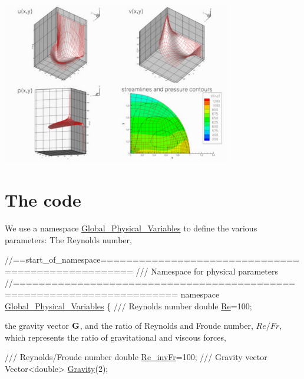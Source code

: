  
\begin{DoxyImage}
\includegraphics[width=0.75\textwidth]{sol2}
\end{DoxyImage}




 

\hypertarget{index_code}{}\section{The code}\label{index_code}
We use a namespace {\ttfamily \hyperlink{namespaceGlobal__Physical__Variables}{Global\+\_\+\+Physical\+\_\+\+Variables}} to define the various parameters\+: The Reynolds number,

 
\begin{DoxyCodeInclude}
\textcolor{comment}{//==start\_of\_namespace===================================================}
\textcolor{comment}{/// Namespace for physical parameters}
\textcolor{comment}{}\textcolor{comment}{//=======================================================================}
\textcolor{keyword}{namespace }\hyperlink{namespaceGlobal__Physical__Variables}{Global\_Physical\_Variables}
\{\textcolor{comment}{}
\textcolor{comment}{ /// Reynolds number}
\textcolor{comment}{} \textcolor{keywordtype}{double} \hyperlink{namespaceGlobal__Physical__Variables_ab814e627d2eb5bc50318879d19ab16b9}{Re}=100;

\end{DoxyCodeInclude}


the gravity vector $ {\bf G}$, and the ratio of Reynolds and Froude number, $ Re/Fr $, which represents the ratio of gravitational and viscous forces,


\begin{DoxyCodeInclude}
\textcolor{comment}{}
\textcolor{comment}{ /// Reynolds/Froude number}
\textcolor{comment}{} \textcolor{keywordtype}{double} \hyperlink{namespaceGlobal__Physical__Variables_ab1a845a672b4d74b304639a976dc65c6}{Re\_invFr}=100;
\textcolor{comment}{}
\textcolor{comment}{ /// Gravity vector}
\textcolor{comment}{} Vector<double> \hyperlink{namespaceGlobal__Physical__Variables_afae321364975eb56688ad13abc8ed6b7}{Gravity}(2);

\end{DoxyCodeInclude}


